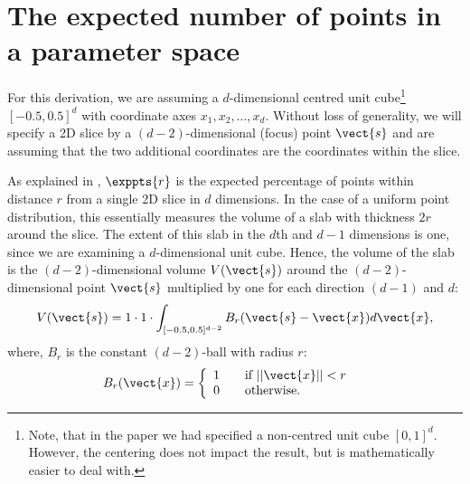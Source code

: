 
\providecommand{\vu}[0]{\vect{u}}
\providecommand{\vv}[0]{\vect{v}}
\providecommand{\vbv}[0]{\vect{\bar{v}}}
\providecommand{\vw}[0]{\vect{w}}
\providecommand{\vx}[0]{\vect{x}}
\providecommand{\vs}[0]{\vect{s}}
\providecommand{\vp}[0]{\vect{p}}

\providecommand{\vsigma}[0]{\vect{\sigma}}
\providecommand{\vvarphi}[0]{\vect{\varphi}}
\providecommand{\vbvarphi}[0]{\vect{\bar{\varphi}}}
\providecommand{\vPhi}[0]{\vect{\Phi}}
\providecommand{\btau}[0]{\bar{\tau}}

\appendix{}

\section{The expected number of points in a \mbox{parameter} space}
\label{sec:app:exppts}


For this derivation, we are assuming a $d$-dimensional centred unit cube\footnote{Note, that in the paper we had specified a non-centred unit cube $[0, 1]^d$. However, the centering does not impact the result, but is mathematically easier to deal with.} $[-0.5, 0.5]^d$ with coordinate axes $x_1, x_2, \ldots, x_d$. Without loss of generality, we will specify a 2D slice by a $(d-2)$-dimensional (focus) point $\vs$ and are assuming that the two additional coordinates are the coordinates within the slice.

As explained in , $\exppts{r}$ is the expected percentage of points within distance $r$ from a single 2D slice in $d$ dimensions. In the case of a uniform point distribution, this essentially measures the volume of a slab with thickness $2r$ around the slice. The extent of this slab in the $d$th and $d-1$ dimensions is one, since we are examining a $d$-dimensional unit cube. Hence, the volume of the slab is the $(d-2)$-dimensional volume $V(\vs)$ around the $(d-2)$-dimensional point $\vs$ multiplied by one for each direction $(d-1)$ and $d$:
\begin{equation}
  V(\vs) = 1 \cdot 1 \cdot \int_{[-0.5,0.5]^{d-2}} B_r(\vs-\vx) d\vx \text{,}
   \label{eq:vs}
\end{equation}
where, $B_r$ is the constant $(d-2)$-ball with radius $r$:
\begin{align*}
  B_r(\vx) &= \left\{ 
  \begin{array}{l l}
    1 & \quad \text{if $||\vx||<r$}\\
    0 & \quad \text{otherwise} \text{.}\\
  \end{array} \right. 
\end{align*}

